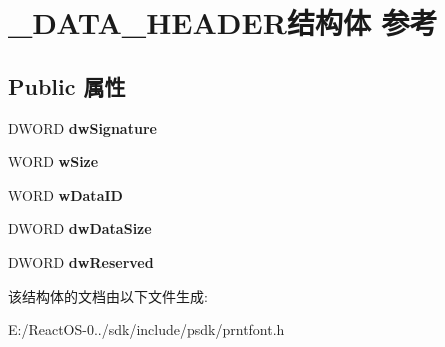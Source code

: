 \hypertarget{struct___d_a_t_a___h_e_a_d_e_r}{}\section{\+\_\+\+D\+A\+T\+A\+\_\+\+H\+E\+A\+D\+E\+R结构体 参考}
\label{struct___d_a_t_a___h_e_a_d_e_r}
\subsection*{Public 属性}
\begin{DoxyCompactItemize}
\item 
\mbox{\label{struct___d_a_t_a___h_e_a_d_e_r_a32e2b493f4f42b36826becf59b2f1daa}} 
D\+W\+O\+RD {\bfseries dw\+Signature}
\item 
\mbox{\label{struct___d_a_t_a___h_e_a_d_e_r_a49cd6664f9287bd92fa2ae72373a512f}} 
W\+O\+RD {\bfseries w\+Size}
\item 
\mbox{\label{struct___d_a_t_a___h_e_a_d_e_r_a7684cd92d280085b882aec0a97065044}} 
W\+O\+RD {\bfseries w\+Data\+ID}
\item 
\mbox{\label{struct___d_a_t_a___h_e_a_d_e_r_ab5247cc9233ca731bb41106f8e589b8c}} 
D\+W\+O\+RD {\bfseries dw\+Data\+Size}
\item 
\mbox{\label{struct___d_a_t_a___h_e_a_d_e_r_a3903d6c0583727b72c88cdf08e32785d}} 
D\+W\+O\+RD {\bfseries dw\+Reserved}
\end{DoxyCompactItemize}


该结构体的文档由以下文件生成\+:\begin{DoxyCompactItemize}
\item 
E\+:/\+React\+O\+S-\/0../sdk/include/psdk/prntfont.\+h\end{DoxyCompactItemize}
